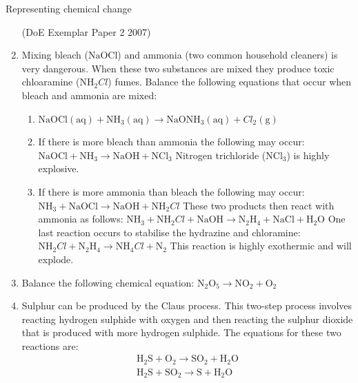 \begin{eocexercises}{Representing chemical change}
\begin{enumerate}[noitemsep, label=\textbf{\arabic*}. ]
\begin{enumerate}[noitemsep, label=\textbf{\alph*}. ]
        \end{enumerate}
(DoE Exemplar Paper 2 2007)
\item Mixing bleach ($\mathrm{NaOCl}$) and ammonia (two common household cleaners) is very dangerous. When these two substances are mixed they produce toxic chloaramine (${\mathrm{NH}}_{2}Cl$) fumes. Balance the following equations that occur when bleach and ammonia are mixed:\label{m38727*id6432}\begin{enumerate}[noitemsep, label=\textbf{\alph*}. ] 
            \item $\mathrm{NaOCl}\left(\mathrm{aq}\right)+{\mathrm{NH}}_{3}\left(\mathrm{aq}\right)\to {\mathrm{NaONH}}_{3}\left(\mathrm{aq}\right)+{Cl}_{2}\left(\mathrm{g}\right)$\item If there is more bleach than ammonia the following may occur:
$\mathrm{NaOCl}+{\mathrm{NH}}_{3}\to \mathrm{NaOH}+{\mathrm{NCl}}_{3}$
\newline
    Nitrogen trichloride (${\mathrm{NCl}}_{3}$) is highly explosive.\item If there is more ammonia than bleach the following may occur:
${\mathrm{NH}}_{3}+\mathrm{NaOCl}\to \mathrm{NaOH}+{\mathrm{NH}}_{2}Cl$\newline
These two products then react with ammonia as follows:\newline
${\mathrm{NH}}_{3}+{\mathrm{NH}}_{2}Cl+\mathrm{NaOH}\to {\mathrm{N}}_{2}{\mathrm{H}}_{4}+\mathrm{NaCl}+{\mathrm{H}}_{2}\mathrm{O}$
\newline
    One last reaction occurs to stabilise the hydrazine and chloramine:
${\mathrm{NH}}_{2}Cl+{\mathrm{N}}_{2}{\mathrm{H}}_{4}\to {\mathrm{NH}}_{4}Cl+{\mathrm{N}}_{2}$\newline
This reaction is highly exothermic and will explode.\end{enumerate}
\item Balance the following chemical equation:
${\mathrm{N}}_{2}{\mathrm{O}}_{5}\to {\mathrm{NO}}_{2}+{\mathrm{O}}_{2}$\newline
        \item Sulphur can be produced by the Claus process. This two-step process involves reacting hydrogen sulphide with oxygen and then reacting the sulphur dioxide that is produced with more hydrogen sulphide. The equations for these two reactions are:
\label{m38727*id6243}\nopagebreak\noindent{}
    \begin{equation}
    \begin{array}{c}{\mathrm{H}}_{2}\mathrm{S}+{\mathrm{O}}_{2}\to {\mathrm{SO}}_{2}+{\mathrm{H}}_{2}\mathrm{O}\\ {\mathrm{H}}_{2}\mathrm{S}+{\mathrm{SO}}_{2}\to \mathrm{S}+{\mathrm{H}}_{2}\mathrm{O}\end{array}\tag{13.25}

\end{equation}
\end{enumerate}
\end{eocexercises}
